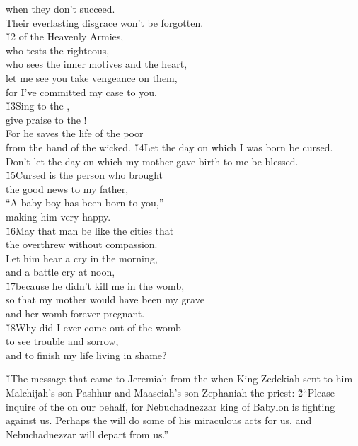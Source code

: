 \begin{poetry}
\poemll    when they don't succeed. \\
\poemlll       Their everlasting disgrace won't be forgotten. \\
\poeml \v{12} of the Heavenly Armies, \\
\poemll    who tests the righteous, \\
\poemll    who sees the inner motives and the heart, \\
\poeml let me see you take vengeance on them, \\
\poemll    for I've committed my case to you. \\
\poeml \v{13}Sing to the , \\
\poemll    give praise to the ! \\
\poeml For he saves the life of the poor \\
\poemll    from the hand of the wicked.
\poeml \v{14}Let the day on which I was born be cursed. \\
\poemll    Don't let the day on which my mother gave birth to me be blessed. \\
\poeml \v{15}Cursed is the person who brought \\
\poemll    the good news to my father, \\
\poeml ``A baby boy has been born to you,'' \\
\poemll    making him very happy. \\
\poeml \v{16}May that man be like the cities that \\
\poemll    the  overthrew without compassion. \\
\poeml Let him hear a cry in the morning, \\
\poemll    and a battle cry at noon, \\
\poeml \v{17}because he didn't kill me in the womb, \\
\poemll    so that my mother would have been my grave \\
\poemlll       and her womb forever pregnant. \\
\poeml \v{18}Why did I ever come out of the womb \\
\poemll    to see trouble and sorrow, \\
\poemlll       and to finish my life living in shame?
\end{poetry}

\v{1}The message that came to Jeremiah from the  when King Zedekiah sent to him Malchijah's son Pashhur and Maaseiah's son Zephaniah the priest: \v{2}``Please inquire of the  on our behalf, for Nebuchadnezzar king of Babylon is fighting against us. Perhaps the  will do some of his miraculous acts for us, and Nebuchadnezzar will depart from us.''

